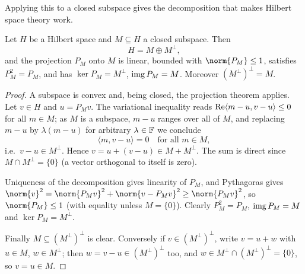 \documentclass[a4paper]{scrartcl}
\newcommand{\ip}[2]{\langle #1, #2 \rangle}
\begin{document}
Applying this to a closed subspace gives the decomposition that makes Hilbert space theory work.

\begin{theorem}
	Let $H$ be a Hilbert space and $M \subseteq H$ a closed subspace. Then
	$$H = M \oplus M^\perp,$$
	and the projection $P_M$ onto $M$ is linear, bounded with $\norm{P_M}\leq 1$, satisfies $P_M^2 = P_M$, and has $\ker P_M = M^\perp$, $\operatorname{img} P_M = M$. Moreover $(M^\perp)^\perp = M$.
\end{theorem}

\begin{proof}
	A subspace is convex and, being closed, the projection theorem applies. Let $v \in H$ and $u = P_M v$. The variational inequality reads $\re \ip{m - u}{v-u}\leq 0$ for all $m \in M$; as $M$ is a subspace, $m - u$ ranges over all of $M$, and replacing $m-u$ by $\lambda(m-u)$ for arbitrary $\lambda \in \mathbb{F}$ we conclude
	$$\ip{m}{v - u} = 0 \quad \text{for all } m \in M,$$
	i.e.\ $v - u \in M^\perp$. Hence $v = u + (v-u) \in M + M^\perp$. The sum is direct since $M \cap M^\perp = \{0\}$ (a vector orthogonal to itself is zero).

	Uniqueness of the decomposition gives linearity of $P_M$, and Pythagoras gives $\norm{v}^2 = \norm{P_Mv}^2 + \norm{v - P_Mv}^2 \geq \norm{P_M v}^2$, so $\norm{P_M}\leq 1$ (with equality unless $M = \{0\}$). Clearly $P_M^2 = P_M$, $\operatorname{img} P_M = M$ and $\ker P_M = M^\perp$.

	Finally $M \subseteq (M^\perp)^\perp$ is clear. Conversely if $v \in (M^\perp)^\perp$, write $v = u + w$ with $u \in M$, $w \in M^\perp$; then $w = v - u \in (M^\perp)^\perp$ too, and $w \in M^\perp \cap (M^\perp)^\perp = \{0\}$, so $v = u \in M$.
\end{proof}

\begin{center}
\end{center}
\end{document}

